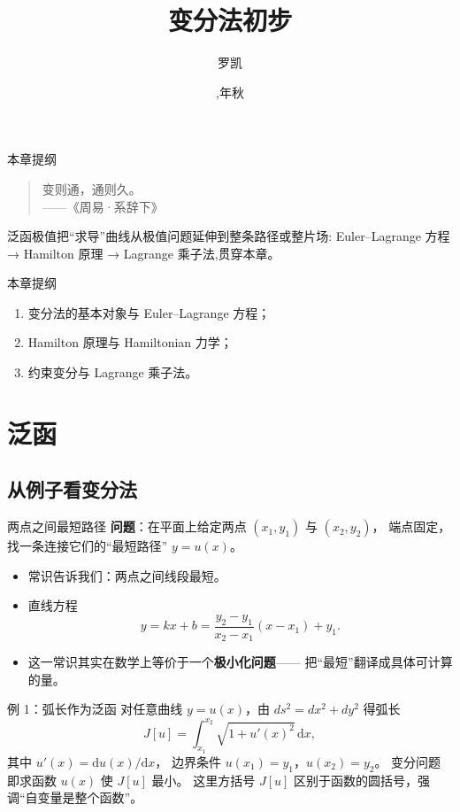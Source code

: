 \documentclass[fontset=windows, chinese, 10pt, xcolor=dvipsnames]{beamer}
\title{变分法初步}
\date{\zhdigits{\the\year},\zhganzhinian{\the\year}年秋}
\author{罗凯}
\institute{南京理工大学物理学院}
\begin{document}
\begin{frame}
  \titlepage
\end{frame}

\begin{frame}{本章提纲}
  \begin{quote}
    变则通，通则久。\\
    \hfill ——《周易·系辞下》
  \end{quote}
  泛函极值把``求导''曲线从极值问题延伸到整条路径或整片场:
  Euler--Lagrange 方程 → Hamilton 原理 → Lagrange 乘子法,贯穿本章。
\end{frame}

\begin{frame}{本章提纲}
  \begin{enumerate}
    \item 变分法的基本对象与 Euler--Lagrange 方程；
    \item Hamilton 原理与 Hamiltonian 力学；
    \item 约束变分与 Lagrange 乘子法。
  \end{enumerate}
\end{frame}

\section{泛函}

\subsection{从例子看变分法}

\begin{frame}{两点之间最短路径}
  \textbf{问题}：在平面上给定两点 $(x_1,y_1)$ 与 $(x_2,y_2)$，
  端点固定，找一条连接它们的``最短路径'' $y=u(x)$。
  \begin{itemize}
    \item 常识告诉我们：两点之间线段最短。
    \item 直线方程
      \begin{equation*}
        y = kx + b
          = \frac{y_2 - y_1}{x_2 - x_1}(x - x_1) + y_1.
      \end{equation*}
    \item 这一常识其实在数学上等价于一个\textbf{极小化问题}——
      把``最短''翻译成具体可计算的量。
  \end{itemize}
\end{frame}

\begin{frame}{例 1：弧长作为泛函}
  对任意曲线 $y=u(x)$，由 $ds^2=dx^2+dy^2$ 得弧长
  \begin{equation*}
    J[u] = \int_{x_1}^{x_2}
        \sqrt{1 + u'(x)^2}\,\mathrm{d}x,
  \end{equation*}
  其中 $u'(x) = \mathrm{d}u(x)/\mathrm{d}x$，
  边界条件 $u(x_1)=y_1$，$u(x_2)=y_2$。
  变分问题即求函数 $u(x)$ 使 $J[u]$ 最小。
  这里方括号 $J[u]$ 区别于函数的圆括号，强调``自变量是整个函数''。
\end{frame}
\end{document}
